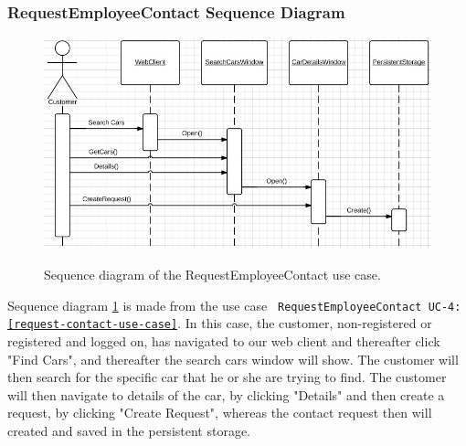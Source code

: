 \subsubsection{RequestEmployeeContact Sequence Diagram}
\begin{figure}[H]
	\centering
		\includegraphics[width=\textwidth]{Figures/SequenceDiagram-RequestEmployeeContact}\\
	\caption{Sequence diagram of the RequestEmployeeContact use case.}
  \label{fig:SequenceDiagram-RequestEmployeeContact}
\end{figure}

Sequence diagram \ref{fig:SequenceDiagram-RequestEmployeeContact} is made from the use case \texttt{ RequestEmployeeContact UC-4: \ref{request-contact-use-case}}.
In this case, the customer, non-registered or registered and logged on, has navigated to our web client and thereafter click "Find Cars", and thereafter the search cars window will show. The customer will then search for the specific car that he or she are trying to find. The customer will then navigate to details of the car, by clicking "Details" and then create a request, by clicking "Create Request", whereas the contact request then will created and saved in the persistent storage.

